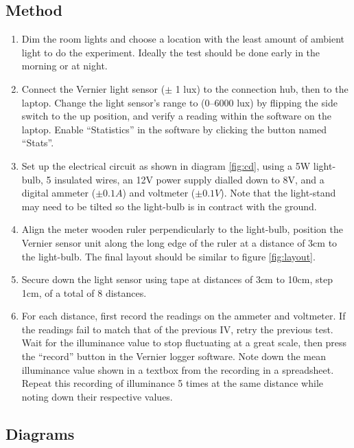 \documentclass[a4paper,12pt]{article}
\begin{document}
\subsection{Method}

\begin{enumerate}
 \item Dim the room lights and choose a location with the least amount of ambient light to do the experiment. Ideally the test should be done early in the morning or at night.

 \item Connect the Vernier light sensor ($\pm$ 1 \si{lux}) to the connection hub, then to the laptop. Change the light sensor's range to (0–6000 \si{lux}) by flipping the side switch to the up position, and verify a reading within the software on the laptop. Enable ``Statistics'' in the software by clicking the button named ``Stats''.

 \item Set up the electrical circuit as shown in diagram \ref{fig:cd}, using a 5W light-bulb, 5 insulated wires, an 12V power supply dialled down to 8V, and a digital ammeter ($\pm 0.1 \si{A}$) and voltmeter ($\pm 0.1 \si{V}$). Note that the light-stand may need to be tilted so the light-bulb is in contract with the ground.

 \item Align the meter wooden ruler perpendicularly to the light-bulb, position the Vernier sensor unit along the long edge of the ruler at a distance of 3cm to the light-bulb. The final layout should be similar to figure \ref{fig:layout}.

 \item Secure down the light sensor using tape at distances of 3cm to 10cm, step 1cm, of a total of 8 distances.

 \item For each distance, first record the readings on the ammeter and voltmeter. If the readings fail to match that of the previous IV, retry the previous test. Wait for the illuminance value to stop fluctuating at a great scale, then press the ``record'' button in the Vernier logger software. Note down the mean illuminance value shown in a textbox from the recording in a spreadsheet. Repeat this recording of illuminance 5 times at the same distance while noting down their respective values.
\end{enumerate}

\subsection{Diagrams}
\end{document}
